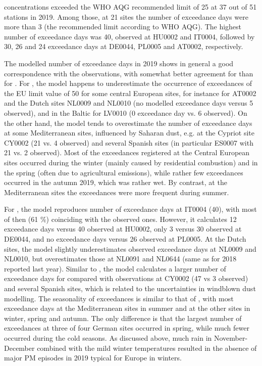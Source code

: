 \PM[2.5] concentrations exceeded the WHO AQG recommended limit of 25 \ug at 37 out of 51
stations in 2019. Among those, at 21 sites the number of exceedance
days were more than 3 (the recommended limit according to WHO AQG). 
The highest number of exceedance days was 40, observed at HU0002 and IT0004, followed by 30, 26 and 24 exceedance days at DE0044, PL0005 and AT0002, respectively.

The modelled number of exceedance days in 2019 shows in general a good correspondence with the observations, with somewhat better agreement for \PM[10] than for \PM[2.5]. For \PM[10], the model happens to underestimate the occurrence of exceedances of the EU limit value of 50 \ug for some central European sites, for instance for AT0002 and the Dutch sites NL0009 and NL0010 (no modelled exceedance days versus 5 observed), and in the Baltic for LV0010 (0 exceedance day vs. 6 observed). On the other hand, the model tends to overestimate the number of exceedance days at some Mediterranean sites, influenced by Saharan dust, e.g. at the Cypriot site CY0002 (21 vs. 4 observed) and several Spanish sites (in particular ES0007 with 21 vs. 2 observed). Most of the exceedances registered at the Central European sites occurred during the winter (mainly caused by residential combustion) and in the spring (often due to agricultural emissions), while rather few exceedances occurred in the autumn 2019, which was rather wet. By contrast, at the Mediterranean sites the exceedances were more frequent during summer.

For \PM[2.5], the model reproduces number of exceedance days at IT0004 (40), with most of then (61 \%) coinciding with the observed ones. However, it calculates 12 exceedance days versus 40 observed at HU0002, only 3 versus 30 observed at DE0044, and no exceedance days versus 26 observed at PL0005. At the Dutch sites, the model slightly underestimates observed \PM[2.5] exceedance days at NL0009 and NL0010, but overestimates those at NL0091 and NL0644 (same as for 2018 reported last year). Similar to \PM[10], the model calculates a larger number of exceedance days for \PM[2.5] compared with observations at CY0002 (47 vs 3 observed) and several Spanish sites, which is related to the uncertainties in windblown dust modelling. The seasonality of \PM[2.5] exceedances is similar to that of \PM[10], with most exceedance days at the Mediterranean sites in summer and at the other sites in winter, spring and autumn. The only difference is that the largest number of \PM[2.5] exceedances at three of four German sites occurred in spring, while much fewer occurred during the cold seasons. As discussed above, much rain in November-December combined with the mild winter temperatures resulted in the absence of major PM episodes in 2019 typical for Europe in winters.

